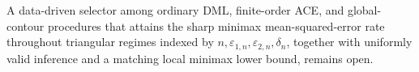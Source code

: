 A data-driven selector among ordinary DML, finite-order ACE, and global-contour procedures that attains the sharp minimax mean-squared-error rate throughout triangular regimes indexed by \(n,\varepsilon_{1,n},\varepsilon_{2,n},\delta_n\), together with uniformly valid inference and a matching local minimax lower bound, remains open.